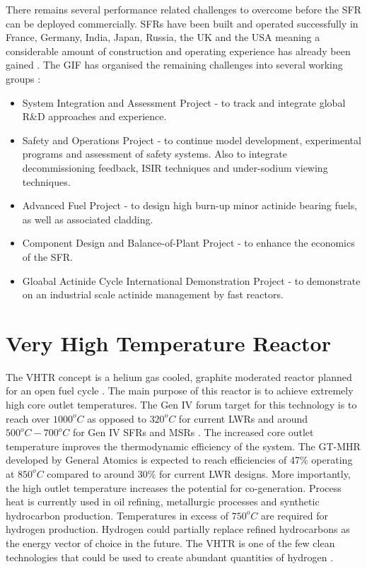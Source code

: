 \documentclass[journal]{IEEEtran}
\begin{document}
There remains several performance related challenges to overcome before the SFR can be deployed commercially. 
SFRs have been built and operated successfully in France, Germany, India, Japan, Russia, the UK and the USA meaning a considerable amount of construction and operating experience has already been gained \cite{Int2012}.
The GIF has organised the remaining challenges into several working groups \cite{GenIVForum}:
\begin{itemize}
\item System Integration and Assessment Project - to track and integrate global R\&D approaches and experience.
\item Safety and Operations Project - to continue model development, experimental programs and assessment of safety systems. Also to integrate decommissioning feedback, ISIR techniques and under-sodium viewing techniques.
\item Advanced Fuel Project - to design high burn-up minor actinide bearing fuels, as well as associated cladding.%
\item Component Design and Balance-of-Plant Project - to enhance the economics of the SFR.%
\item Gloabal Actinide Cycle International Demonstration Project - to demonstrate on an industrial scale actinide management by fast reactors.
\end{itemize}



\section{Very High Temperature Reactor}
The VHTR concept is a helium gas cooled, graphite moderated reactor planned for an open fuel cycle \cite{Marques2010a}.
The main purpose of this reactor is to achieve extremely high core outlet temperatures. The Gen IV forum target for this technology is to reach over $1000^oC$ \cite{GenIVRoadmap} as opposed to $320^oC$ for current LWRs and around $500^oC-700^oC$ for Gen IV SFRs and MSRs \cite{Bhatnagar2011}.
The increased core outlet temperature improves the thermodynamic efficiency of the system.
The GT-MHR developed by General Atomics is expected to reach efficiencies of 47\% operating at $850^oC$ \cite{Marques2010a} compared to around 30\% for current LWR designs.
More importantly, the high outlet temperature increases the potential for co-generation.
Process heat is currently used in oil refining, metallurgic processes and synthetic hydrocarbon production.
Temperatures in excess of $750^oC$ are required for hydrogen production.%
Hydrogen could partially replace refined hydrocarbons as the energy vector of choice in the future.
The VHTR is one of the few clean technologies that could be used to create abundant quantities of hydrogen \cite{Bhatnagar2011}.
\end{document}
